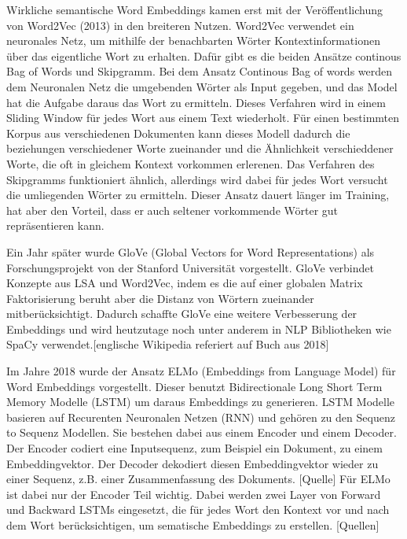 Wirkliche semantische Word Embeddings kamen erst mit der Veröffentlichung von Word2Vec (2013) in den breiteren Nutzen. 
Word2Vec verwendet ein neuronales Netz, um mithilfe der benachbarten Wörter Kontextinformationen über das eigentliche Wort zu erhalten. 
Dafür gibt es die beiden Ansätze continous Bag of Words und Skipgramm.
Bei dem Ansatz Continous Bag of words werden dem Neuronalen Netz die umgebenden Wörter als Input gegeben, und das Model hat die Aufgabe daraus das Wort zu ermitteln. 
Dieses Verfahren wird in einem Sliding Window für jedes Wort aus einem Text wiederholt. 
Für einen bestimmten Korpus aus verschiedenen Dokumenten kann dieses Modell dadurch die beziehungen verschiedener Worte zueinander und die Ähnlichkeit verschieddener Worte, die oft in gleichem Kontext vorkommen erlerenen. 
Das Verfahren des Skipgramms funktioniert ähnlich, allerdings wird dabei für jedes Wort versucht die umliegenden Wörter zu ermitteln. 
Dieser Ansatz dauert länger im Training, hat aber den Vorteil, dass er auch seltener vorkommende Wörter gut repräsentieren kann.

Ein Jahr später wurde GloVe (Global Vectors for Word Representations) als Forschungsprojekt von der Stanford Universität vorgestellt. 
GloVe verbindet Konzepte aus LSA und Word2Vec, indem es die auf einer globalen Matrix Faktorisierung beruht aber die Distanz von Wörtern zueinander mitberücksichtigt.
Dadurch schaffte GloVe eine weitere Verbesserung der Embeddings und wird heutzutage noch unter anderem in NLP Bibliotheken wie SpaCy verwendet.[englische Wikipedia referiert auf Buch aus 2018]

Im Jahre 2018 wurde der Ansatz ELMo (Embeddings from Language Model) für Word Embeddings vorgestellt.
Dieser benutzt Bidirectionale Long Short Term Memory Modelle (LSTM) um daraus Embeddings zu generieren.
LSTM Modelle basieren auf Recurenten Neuronalen Netzen (RNN) und gehören zu den Sequenz to Sequenz Modellen. 
Sie bestehen dabei aus einem Encoder und einem Decoder.
Der Encoder codiert eine Inputsequenz, zum Beispiel ein Dokument, zu einem Embeddingvektor. 
Der Decoder dekodiert diesen Embeddingvektor wieder zu einer Sequenz, z.B. einer Zusammenfassung des Dokuments. [Quelle]
Für ELMo ist dabei nur der Encoder Teil wichtig.
Dabei werden zwei Layer von Forward und Backward LSTMs eingesetzt, die für jedes Wort den Kontext vor und nach dem Wort berücksichtigen, um sematische Embeddings zu erstellen. [Quellen]

